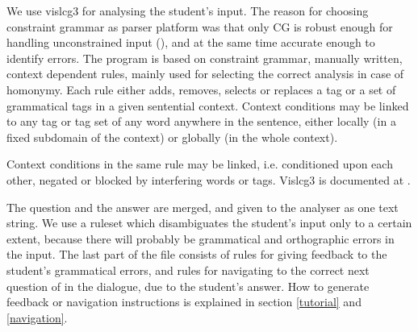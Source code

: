 \documentclass[11pt]{article}
\begin{document}
%
%
%

We use vislcg3 for analysing the student's input. The reason for choosing constraint grammar as parser platform was that only CG is robust enough for handling unconstrained input (), and at the same time accurate enough to identify errors. The program is based on constraint grammar, manually written, context dependent rules, mainly used for selecting the correct analysis in case of homonymy. Each rule either adds, removes, selects or replaces a tag or a set of grammatical tags in a given sentential context. Context conditions may be linked to any tag or tag set of any word anywhere in the sentence, either locally (in a fixed subdomain of the context) or globally (in the whole context). 

Context conditions in the same rule may be linked, i.e. conditioned upon each other, negated or blocked by interfering words or tags. Vislcg3 is documented at \cite{Visl:08}.

The question and the answer are merged, and given to the analyser as one text string. We use a ruleset which disambiguates the student's input only to a certain extent, because there will probably be grammatical and orthographic errors in the input. The last part of the file consists of rules for giving feedback to the student's grammatical errors, and rules for navigating to the correct next question of in the dialogue, due to the student's answer. How to generate feedback or navigation instructions is explained in section \ref{tutorial} and \ref{navigation}.
\end{document}
